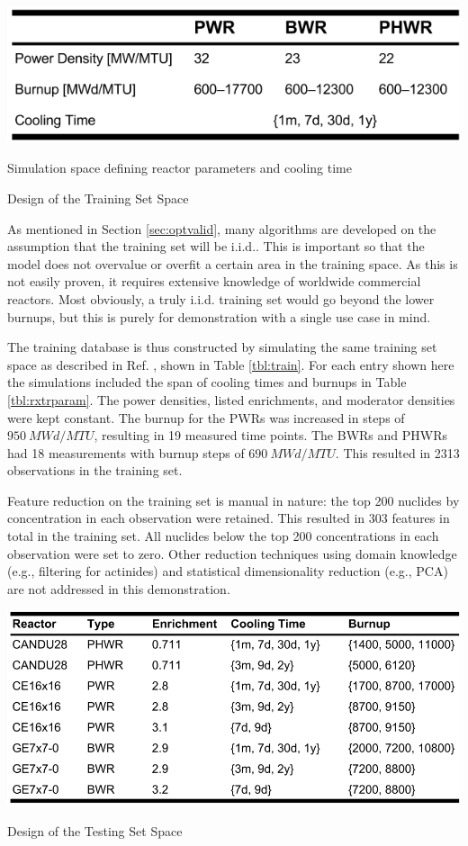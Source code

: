 \begin{table}[!hp]
  \begin{subtable}{\linewidth}
    \centering
    \includegraphics[width=0.7\linewidth]{./chapters/method/TrainData2.png}
    \caption{Simulation space defining reactor parameters and cooling time}
    \label{tbl:rxtrparam}
  \end{subtable}%
  \caption{Design of the Training Set Space}
  \label{tbl:train}
\end{table}

As mentioned in Section \ref{sec:optvalid}, many algorithms are developed on
the assumption that the training set will be \acrfull{i.i.d.}. This is
important so that the model does not overvalue or overfit a certain area in the
training space. As this is not easily proven, it requires extensive knowledge
of worldwide commercial reactors. Most obviously, a truly \gls{i.i.d.} training
set would go beyond the lower burnups, but this is purely for demonstration
with a single use case in mind.  

The training database is thus constructed by simulating the same training set
space as described in Ref.  \cite{dayman_feasibility_2013}, shown in Table
\ref{tbl:train}. For each entry shown here the simulations included the span of
cooling times and burnups in Table \ref{tbl:rxtrparam}. The power densities,
listed enrichments, and moderator densities were kept constant. The burnup for
the \glspl{PWR} was increased in steps of $950\ MWd/MTU$, resulting in 19
measured time points. The \glspl{BWR} and \glspl{PHWR} had 18 measurements with
burnup steps of $690\ MWd/MTU$.  This resulted in 2313 observations in the
training set.

Feature reduction on the training set is manual in nature: the top 200 nuclides
by concentration in each observation were retained. This resulted in 303
features in total in the training set. All nuclides below the top 200
concentrations in each observation were set to zero. Other reduction techniques
using domain knowledge (e.g., filtering for actinides) and statistical
dimensionality reduction (e.g., \gls{PCA}) are not addressed in this
demonstration.

\begin{table}[!hbt]
  \centering
  \includegraphics[width=0.95\linewidth]{./chapters/method/TestData.png}
  \caption{Design of the Testing Set Space}
  \label{tbl:test}
\end{table}

